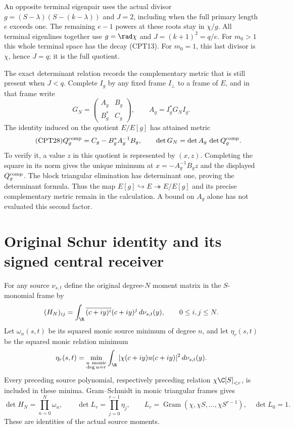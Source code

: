 \documentclass[11pt,a4paper]{article}
\begin{document}
An opposite terminal eigenpair uses the actual divisor
\(g=(S-\lambda)(S-(k-\lambda))\) and \(J=2\), including when
the full primary length \(e\) exceeds one.  The remaining
\(e-1\) powers at these roots stay in \(\chi/g\).
All terminal eigenlines together use \(g=\rad\chi\) and
\(J=(k+1)^2=q/e\).  For \(m_0>1\) this whole terminal space
has the decay (CPT13).  For \(m_0=1\), this last divisor is
\(\chi\), hence \(J=q\); it is the full quotient.

The exact determinant relation records the complementary metric
that is still present when \(J<q\).  Complete \(I_g\) by any fixed
frame \(I_\perp\) to a frame of \(E\), and in that frame write
\[
 G_N=\begin{pmatrix} A_g&B_g\\B_g^*&C_g\end{pmatrix},
 \qquad A_g=I_g^*G_NI_g.
\]
The identity induced on the quotient \(E/E[g]\) has attained
metric
\begin{equation}\tag{CPT28}
 Q_g^{\rm comp}=C_g-B_g^*A_g^{-1}B_g,\qquad
 \det G_N=\det A_g\,\det Q_g^{\rm comp}.
\end{equation}
To verify it, a value \(z\) in this quotient is represented by
\((x,z)\).  Completing the square in its norm gives the unique
minimum at \(x=-A_g^{-1}B_gz\) and the displayed \(Q_g^{\rm comp}\).
The block triangular elimination has determinant one, proving
the determinant formula.  Thus the map \(E[g]\hookrightarrow
E\twoheadrightarrow E/E[g]\) and its precise complementary
metric remain in the calculation.  A bound on \(A_g\) alone
has not evaluated this second factor.

\section{Original Schur identity and its signed central receiver}
\label{cpt:sec:determinants}

For any source \(\nu_{s,t}\) define the original degree-\(N\)
moment matrix in the \(S\)-monomial frame by
\[
 (H_N)_{ij}=\int_\R
       \overline{(c+iy)^i}(c+iy)^j\,d\nu_{s,t}(y),
 \qquad 0\le i,j\le N.
\]
Let \(\omega_n(s,t)\) be its squared monic source minimum of
degree \(n\), and let \(\eta_r(s,t)\) be the squared monic
relation minimum
\[
 \eta_r(s,t)=
 \min_{\substack{u\ {\rm monic}\\\deg u=r}}
 \int_\R|\chi(c+iy)u(c+iy)|^2\,d\nu_{s,t}(y).
\]
Every preceding source polynomial, respectively preceding
relation \(\chi\C[S]_{<r}\), is included in these minima.
Gram--Schmidt in monic triangular frames gives
\[
 \det H_N=\prod_{n=0}^N\omega_n,\qquad
 \det L_r=\prod_{j=0}^{r-1}\eta_j,
 \qquad
 L_r=\operatorname{Gram}(\chi,\chi S,\ldots,\chi S^{r-1}),
 \quad \det L_0=1.
\]
These are identities of the actual source moments.
\end{document}
